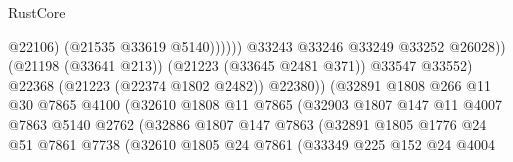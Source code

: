 \begin{lexlean}{RustCore}
\begin{coremodule}
                                                        @22106)
                                                      (@21535 @33619 @5140))))))
                                            @33243
                                            @33246
                                            @33249
                                            @33252
                                            @26028))
                                        (@21198 (@33641 @213))
                                        (@21223 (@33645 @2481 @371))
                                        @33547
                                        @33552)
                                      @22368
                                      (@21223 (@22374 @1802 @2482))
                                      @22380))
                                  (@32891
                                    @1808
                                    @266
                                    @11
                                    @30
                                    @7865
                                    @4100
                                    (@32610
                                      @1808
                                      @11
                                      @7865
                                      (@32903
                                        @1807
                                        @147
                                        @11
                                        @4007
                                        @7863
                                        @5140
                                        @2762
                                        (@32886
                                          @1807
                                          @147
                                          @7863
                                          (@32891
                                            @1805
                                            @1776
                                            @24
                                            @51
                                            @7861
                                            @7738
                                            (@32610
                                              @1805
                                              @24
                                              @7861
                                              (@33349
                                                @225
                                                @152
                                                @24
                                                @4004

\end{coremodule}
\end{lexlean}
